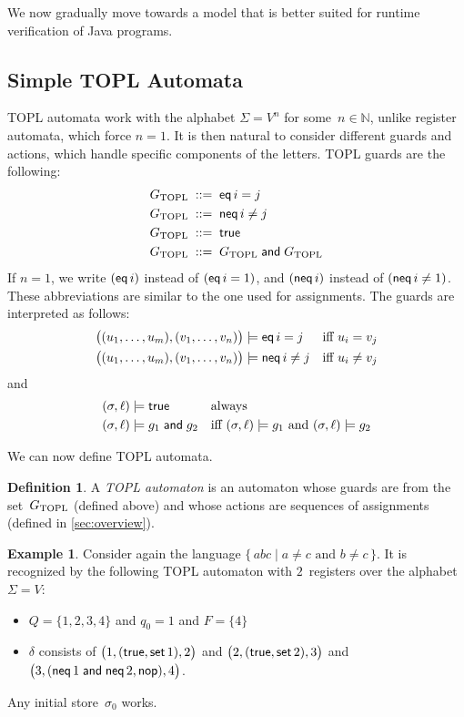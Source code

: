 \documentclass[9pt, preprint]{sigplanconf} %
\newcommand{\N}{\ensuremath{\mathbb{N}}}
\theoremstyle{definition}
\newtheorem{definition}{Definition}
\newtheorem{example}{Example}
\theoremstyle{remark}
\begin{document}
We now gradually move towards a model that is better suited for runtime verification of Java programs.

\subsection{Simple TOPL Automata} %

TOPL automata work with the alphabet $\Sigma=V^n$ for some~$n\in\N$, unlike register automata, which force $n=1$.
It is then natural to consider different guards and actions, which handle specific components of the letters.
TOPL guards are the following:
\begin{align*}
G_{\rm TOPL} &\;::=\; {\sf eq}\,i=j \\
G_{\rm TOPL} &\;::=\; {\sf neq}\,i\ne j \\
G_{\rm TOPL} &\;::=\; {\sf true} \\
G_{\rm TOPL} &\;::=\; G_{\rm TOPL} \mathrel{\sf and} G_{\rm TOPL}
\end{align*}
If $n=1$, we write $({\sf eq}\,i)$ instead of $({\sf eq}\,i=1)$, and $({\sf neq}\,i)$ instead of $({\sf neq}\,i\ne1)$.
These abbreviations are similar to the one used for assignments.
The guards are interpreted as follows:
\begin{align*}
\bigl((u_1,\ldots,u_m),(v_1,\ldots,v_n)\bigr) &\models {\sf eq}\,i=j
  &&\text{iff $u_i=v_j$} \\
\bigl((u_1,\ldots,u_m),(v_1,\ldots,v_n)\bigr) &\models {\sf neq}\,i\ne j
  &&\text{iff $u_i\ne v_j$}
\end{align*}
and
\begin{align*}
(\sigma,\ell) &\models {\sf true}
  &&\text{always} \\
(\sigma,\ell) &\models g_1\mathrel{\sf and} g_2
  &&\text{iff $(\sigma,\ell)\models g_1$ and $(\sigma,\ell)\models g_2$}
\end{align*}

We can now define TOPL automata.

\begin{definition}
A \emph{TOPL automaton} is an automaton whose guards are from the set~$G_{\rm TOPL}$ (defined above) and whose actions are sequences of assignments (defined in \autoref{sec:overview}).
\end{definition}

\begin{example}\label{ex:topl1}
Consider again the language $\{\,abc\mid\text{$a\ne c$ and $b\ne c$}\,\}$.
It is recognized by the following TOPL automaton with $2$~registers over the alphabet $\Sigma=V$:
\begin{itemize}
\item $Q=\{1,2,3,4\}$ and $q_0=1$ and $F=\{4\}$
\item $\delta$ consists of
  $\bigl(1,({\sf true}, {\sf set}\,1),2\bigr)$
  and $\bigl(2,({\sf true}, {\sf set}\,2),3\bigr)$
  and $\bigl(3,({\sf neq}\,1\mathrel{\sf and}{\sf neq}\,2, {\sf nop}),4\bigr)$.
\end{itemize}
Any initial store~$\sigma_0$ works.
\end{example}
\end{document}
